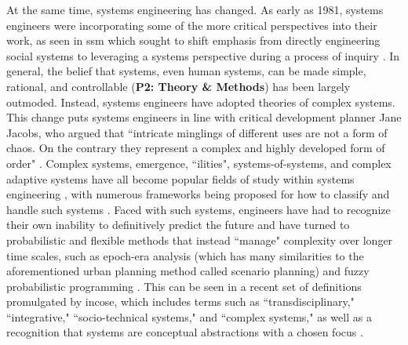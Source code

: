 At the same time, systems engineering has changed.  As early as 1981, systems engineers were incorporating some of the more critical perspectives into their work, as seen in \ac{ssm} which sought to shift emphasis from directly engineering social systems to leveraging a systems perspective during a process of inquiry \cite{checklandSystemsThinkingSystems1999}. In general, the belief that systems, even human systems, can be made simple, rational, and controllable (\textbf{P2: Theory \& Methods}) has been largely outmoded. Instead, systems engineers have adopted theories of complex systems. This change puts systems engineers in line with critical development planner Jane Jacobs, who argued that ``intricate minglings of different uses are not a form of chaos. On the contrary they represent a complex and highly developed form of order" \cite{jacobsDeathLifeGreat2016}. Complex systems, emergence, ``ilities", systems-of-systems, and complex adaptive systems have all become popular fields of study within systems engineering \cite{mcdermidComplexityConceptCauses2000, sussmanCollectedViewsComplexity2002, chenComplexityEmergenceEngineering2009, deguetElementsEmergenceIssue2006, officeofthedirectorofsystemsandsoftwareengineeringSystemsEngineeringGuide2008, glassComplexAdaptiveSystems2011, incosecomplexsystemsworkinggroupComplexityPrimerSystems2016, keatingSystemsSystemsEngineering2011, mittalHumanLoopSystem2015, sheardPracticalApplicationsComplexity2005, tolkResearchAgendaSupport2015}, with numerous frameworks being proposed for how to classify and handle such systems \cite{kurtzNewDynamicsStrategy2003, martinFrameworkQuantifyingComplexity2004, sheardComplexityTypologySystems2010, righiCharacterizingComplexitySociotechnical2012, schottlQuantifyingComplexitySocioTechnical2015, reymondetFrameworkSenseMakingComplex2016}. Faced with such systems, engineers have had to recognize their own inability to definitively predict the future and have turned to probabilistic and flexible methods that instead ``manage" complexity over longer time scales, such as epoch-era analysis \cite{rossUsingNaturalValueCentric2008, vascikMethodExploringProgram2015} (which has many similarities to the aforementioned urban planning method called scenario planning) and fuzzy probabilistic programming \cite{zhangRobustStochasticFuzzy2009, liuInexactStochasticFuzzy2015}. This can be seen in a recent set of definitions promulgated by \ac{incose}, which includes terms such as ``transdisciplinary," ``integrative," ``socio-technical systems," and ``complex systems," as well as a recognition that systems are conceptual abstractions with a chosen focus \cite{sillittoSystemsEngineeringSystem2019}. 

